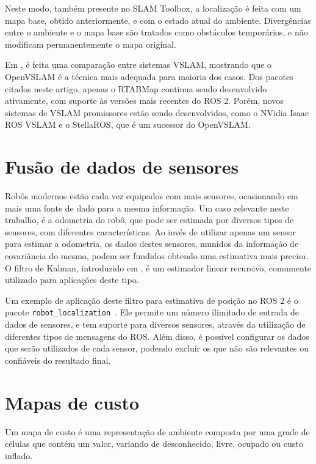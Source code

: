 \documentclass[repeatfields,xlists,xpacks,oneside,yearsonly]{ufrgscca}
\begin{document}
Neste modo, também presente no SLAM Toolbox, a localização é feita
com um mapa base, obtido anteriormente, e com o estado atual do
ambiente. Divergências entre o ambiente e o mapa base são tratados
como obstáculos temporários, e não modificam permanentemente o mapa
original.

Em \textcite{VSLAM}, é feita uma comparação entre sistemas VSLAM,
mostrando que o OpenVSLAM é a técnica mais adequada para maioria dos
casos. Dos pacotes citados neste artigo, apenas o RTABMap continua
sendo desenvolvido ativamente, com suporte às versões mais recentes
do ROS 2. Porém, novos sistemas de VSLAM promissores estão sendo
desenvolvidos, como o NVidia Isaac ROS VSLAM e o StellaROS, que é um
sucessor do OpenVSLAM.

\section{Fusão de dados de sensores}

Robôs modernos estão cada vez equipados com mais sensores,
ocasionando em mais uma fonte de dado para a mesma informação. Um
caso relevante neste trabalho, é a odometria do robô, que pode ser
estimada por diversos tipos de sensores, com diferentes
características. Ao invés de utilizar apenas um sensor para estimar a
odometria, os dados destes sensores, munidos da informação de
covariância do mesmo, podem ser fundidos obtendo uma estimativa mais
precisa. O filtro de Kalman, introduzido em \textcite{KalmanFilter},
é um estimador linear recursivo, comumente utilizado para aplicações
deste tipo.

Um exemplo de aplicação deste filtro para estimativa de posição no
ROS 2 é o pacote
\texttt{robot\_localization}~\cite{robot_localization_paper}. Ele
permite um número ilimitado de entrada de dados de sensores, e tem
suporte para diversos sensores, através da utilização de diferentes
tipos de mensagens do ROS. Além disso, é possível configurar os dados
que serão utilizados de cada sensor, podendo excluir os que não são
relevantes ou confiáveis do resultado final.

\section{Mapas de custo}

Um mapa de custo é uma representação de ambiente composta por uma
grade de células que contém um valor, variando de desconhecido,
livre, ocupado ou custo inflado.
\end{document}
